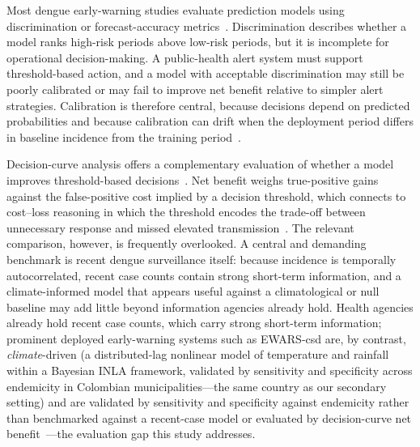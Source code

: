 \documentclass[11pt,a4paper]{article}
\begin{document}
Most dengue early-warning studies evaluate prediction models using discrimination or forecast-accuracy metrics~\cite{Johansson2019,Baharom2022,HussainAlkhateeb2021,Lowe2021}. Discrimination describes whether a model ranks high-risk periods above low-risk periods, but it is incomplete for operational decision-making. A public-health alert system must support threshold-based action, and a model with acceptable discrimination may still be poorly calibrated or may fail to improve net benefit relative to simpler alert strategies. Calibration is therefore central, because decisions depend on predicted probabilities and because calibration can drift when the deployment period differs in baseline incidence from the training period~\cite{VanCalster2019,VanCalster2023,SteyerbergVergouwe2014}.

Decision-curve analysis offers a complementary evaluation of whether a model improves threshold-based decisions~\cite{Vickers2006,Vickers2016,Vickers2019}. Net benefit weighs true-positive gains against the false-positive cost implied by a decision threshold, which connects to cost--loss reasoning in which the threshold encodes the trade-off between unnecessary response and missed elevated transmission~\cite{Murphy1985,Tozan2023}. The relevant comparison, however, is frequently overlooked. A central and demanding benchmark is recent dengue surveillance itself: because incidence is temporally autocorrelated, recent case counts contain strong short-term information, and a climate-informed model that appears useful against a climatological or null baseline may add little beyond information agencies already hold. Health agencies already hold recent case counts, which carry strong short-term information; prominent deployed early-warning systems such as EWARS-csd are, by contrast, \emph{climate}-driven (a distributed-lag nonlinear model of temperature and rainfall within a Bayesian INLA framework, validated by sensitivity and specificity across endemicity in Colombian municipalities---the same country as our secondary setting) and are validated by sensitivity and specificity against endemicity rather than benchmarked against a recent-case model or evaluated by decision-curve net benefit~\cite{EWARScsd}---the evaluation gap this study addresses.
\end{document}
